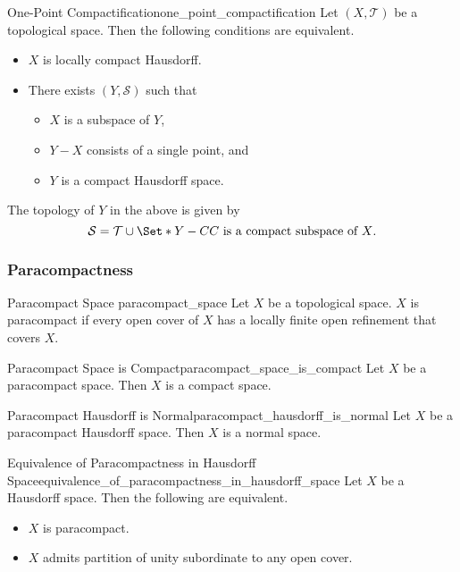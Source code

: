 \documentclass{article}
\begin{document}
\begin{theorem}{One-Point Compactification}{one_point_compactification}
    Let $(X,\mathcal{T})$ be a topological space.
    Then the following conditions are equivalent.
    \begin{itemize}
        \item $X$ is locally compact Hausdorff.
        \item There exists $(Y,\mathcal{S})$ such that
        \begin{itemize}
            \item $X$ is a subspace of $Y$,
            \item $Y-X$ consists of a single point, and
            \item $Y$ is a compact Hausdorff space.
        \end{itemize}
    \end{itemize}
\end{theorem}

The topology of $Y$ in the above is given by
\[ \mathcal{S} = \mathcal{T} \cup \Set*{Y-C}{C \text{ is a compact subspace of } X}. \]

\subsubsection{Paracompactness}

\begin{definition}{Paracompact Space }{paracompact_space}
    Let $X$ be a topological space.
    $X$ is paracompact if every open cover of $X$ has a locally finite open refinement that covers $X$.
\end{definition}

\begin{theorem}{Paracompact Space is Compact}{paracompact_space_is_compact}
    Let $X$ be a paracompact space.
    Then $X$ is a compact space.
\end{theorem}

\begin{theorem}{Paracompact Hausdorff is Normal}{paracompact_hausdorff_is_normal}
    Let $X$ be a paracompact Hausdorff space.
    Then $X$ is a normal space.
\end{theorem}

\begin{theorem}{Equivalence of Paracompactness in Hausdorff Space}{equivalence_of_paracompactness_in_hausdorff_space}
    Let $X$ be a Hausdorff space.
    Then the following are equivalent.
    \begin{itemize}
        \item $X$ is paracompact.
        \item $X$ admits partition of unity subordinate to any open cover.
    \end{itemize}
\end{theorem}
\end{document}
